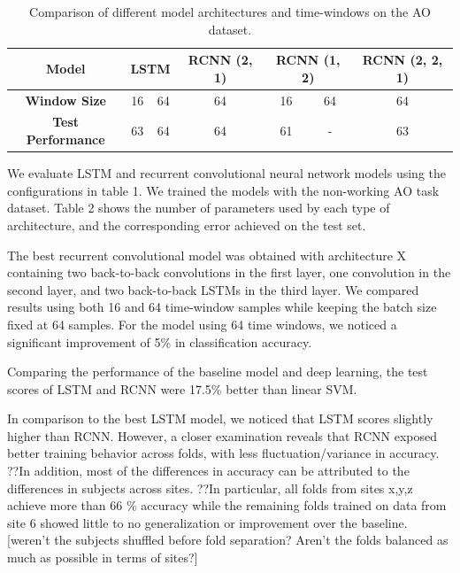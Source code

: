 \documentclass{article}
\begin{document}
\begin{table}[]
\centering
\caption{Comparison of different model architectures and time-windows on the AO dataset.}
\label{table_1}
\begin{tabular}{|c|c|c|c|c|c|c|}
\hline
\textbf{Model}           & \multicolumn{2}{c|}{\textbf{LSTM}} & \textbf{RCNN (2, 1)} & \multicolumn{2}{c|}{\textbf{RCNN (1, 2)}} & \textbf{RCNN (2, 2, 1)} \\ \hline
\textbf{Window Size}      & 16   & 64   & 64    &16    & 64    & 64           \\ \hline
\textbf{Test Performance} & 63   & 64   & 64    & 61      & -           & 63      \\  \hline      
\end{tabular}
\end{table}


We evaluate LSTM and recurrent convolutional neural network models using the configurations in table 1. We trained the models with the non-working AO task dataset. Table 2 shows the number of parameters used by each type of architecture, and the corresponding error achieved on the test set.

The best recurrent convolutional model was obtained with architecture X containing two back-to-back convolutions in the first layer, one convolution in the second layer, and two back-to-back LSTMs in the third layer. We compared results using both 16 and 64 time-window samples while keeping the batch size fixed at 64 samples. For the model using 64 time windows, we noticed a significant improvement of 5\% in classification accuracy.

Comparing the performance of the baseline model and deep learning, the test scores of LSTM and RCNN were 17.5\% better than linear SVM.

In comparison to the best LSTM model, we noticed that LSTM scores slightly higher than RCNN. However, a closer examination reveals that RCNN exposed better training behavior across folds, with less fluctuation/variance in accuracy. ??In addition, most of the differences in accuracy can be attributed to the differences in subjects across sites. ??In particular, all folds from sites x,y,z achieve more than 66 \% accuracy while the remaining folds trained on data from site 6 showed little to no generalization or improvement over the baseline. [weren't the subjects shuffled before fold separation? Aren't the folds balanced as much as possible in terms of sites?]
\end{document}
